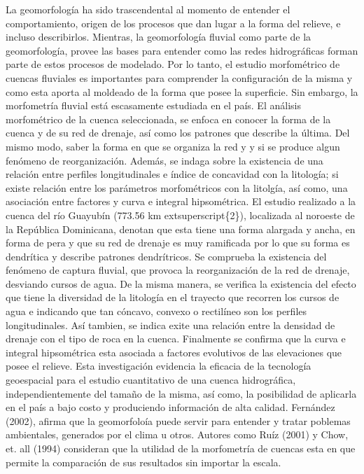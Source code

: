 \documentclass[11pt,]{article}
\renewenvironment{abstract}
 {{%
    \setlength{\leftmargin}{0mm}
    \setlength{\rightmargin}{\leftmargin}%
  }%
  \relax}
 {\endlist}
\begin{document}
\begin{abstract}

    \hbox{\vrule height .2pt width 39.14pc}

    \vskip 8.5pt %

\noindent La geomorfología ha sido trascendental al momento de entender el
comportamiento, origen de los procesos que dan lugar a la forma del
relieve, e incluso describirlos. Mientras, la geomorfología fluvial como
parte de la geomorfología, provee las bases para entender como las redes
hidrográficas forman parte de estos procesos de modelado. Por lo tanto,
el estudio morfométrico de cuencas fluviales es importantes para
comprender la configuración de la misma y como esta aporta al moldeado
de la forma que posee la superficie. Sin embargo, la morfometría fluvial
está escasamente estudiada en el país. El análisis morfométrico de la
cuenca seleccionada, se enfoca en conocer la forma de la cuenca y de su
red de drenaje, así como los patrones que describe la última. Del mismo
modo, saber la forma en que se organiza la red y y si se produce algun
fenómeno de reorganización. Además, se indaga sobre la existencia de una
relación entre perfiles longitudinales e índice de concavidad con la
litología; si existe relación entre los parámetros morfométricos con la
litolgía, así como, una asociación entre factores y curva e integral
hipsométrica. El estudio realizado a la cuenca del río Guayubín (773.56
km extsuperscript\{2\}), localizada al noroeste de la República
Dominicana, denotan que esta tiene una forma alargada y ancha, en forma
de pera y que su red de drenaje es muy ramificada por lo que su forma es
dendrítica y describe patrones dendrítricos. Se comprueba la existencia
del fenómeno de captura fluvial, que provoca la reorganización de la red
de drenaje, desviando cursos de agua. De la misma manera, se verifica la
existencia del efecto que tiene la diversidad de la litología en el
trayecto que recorren los cursos de agua e indicando que tan cóncavo,
convexo o rectilíneo son los perfiles longitudinales. Así tambien, se
indica exite una relación entre la densidad de drenaje con el tipo de
roca en la cuenca. Finalmente se confirma que la curva e integral
hipsométrica esta asociada a factores evolutivos de las elevaciones que
posee el relieve. Esta investigación evidencia la eficacia de la
tecnología geoespacial para el estudio cuantitativo de una cuenca
hidrográfica, independientemente del tamaño de la misma, así como, la
posibilidad de aplicarla en el país a bajo costo y produciendo
información de alta calidad. Fernández (2002), afirma que la
geomorfoloía puede servir para entender y tratar poblemas ambientales,
generados por el clima u otros. Autores como Ruíz (2001) y Chow, et. all
(1994) consideran que la utilidad de la morfometría de cuencas esta en
que permite la comparación de sus resultados sin importar la escala.



\end{abstract}
\end{document}
